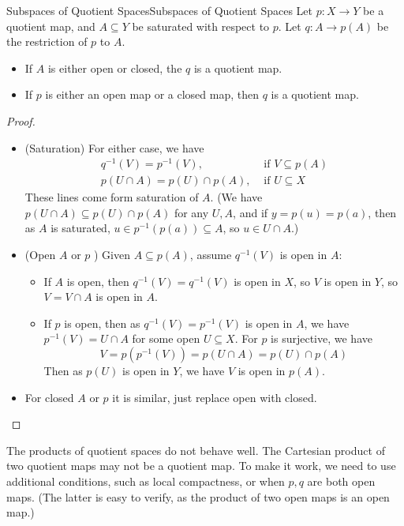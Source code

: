 \documentclass[../main.tex]{subfiles}
\begin{document}
\begin{theorem}{Subspaces of Quotient Spaces}{Subspaces of Quotient Spaces}
	Let $p: X \rightarrow Y$ be a quotient map, and $A \subseteq Y$ be saturated with respect to $p$. Let $q: A \rightarrow p(A)$ be the restriction of $p$ to $A$.
	\begin{itemize}
	\item If $A$ is either open or closed, the $q$ is a quotient map.
	\item If $p$ is either an open map or a closed map, then $q$ is a quotient map.
	\end{itemize}
\end{theorem}
\begin{proof}
\begin{itemize}
\item (Saturation) For either case, we have
	\begin{equation*}
	\begin{aligned}
		q^{-1}(V) = p^{-1}(V), & \text{ if } V \subseteq p(A) \\
		p(U\cap A) = p(U) \cap p(A), & \text{ if } U \subseteq X
	\end{aligned}
	\end{equation*}
	These lines come form saturation of $A$. (We have $p(U\cap A) \subseteq p(U)\cap p(A)$ for any $U,A$, and if $y=p(u)=p(a)$, then as $A$ is saturated, $u \in p^{-1}(p(a)) \subseteq A$, so $u\in U\cap A$.)
\item (Open $A$ or $p$ ) Given $A \subseteq p(A)$, assume $q^{-1}(V)$ is open in $A$:
	\begin{itemize}
	\item If $A$ is open, then $q^{-1}(V) = q^{-1}(V)$ is open in $X$, so $V$ is open in $Y$, so $V = V\cap A$ is open in $A$.
	\item If $p$ is open, then as $q^{-1}(V) = p^{-1}(V)$ is open in $A$, we have $p^{-1}(V) = U\cap A$ for some open $U \subseteq X$. For $p$ is surjective, we have
		\begin{equation*}
		V = p(p^{-1}(V)) = p(U\cap A) = p(U) \cap p(A)
		\end{equation*}
	Then as $p(U)$ is open in $Y$, we have $V$ is open in $p(A)$.
	\end{itemize}
\item For closed $A$ or $p$ it is similar, just replace open with closed.
\end{itemize}
\end{proof}

The products of quotient spaces do not behave well. The Cartesian product of two quotient maps may not be a quotient map. To make it work, we need to use additional conditions, such as local compactness, or when $p,q$ are both open maps. (The latter is easy to verify, as the product of two open maps is an open map.)
\end{document}
